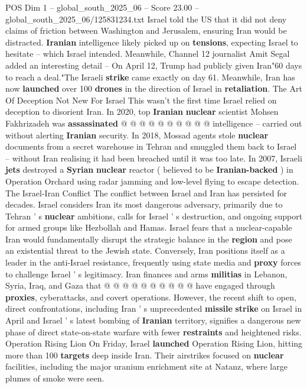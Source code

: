 \begin{textsample}{POS Dim 1 – global\_south\_2025\_06 – Score 23.00 – global\_south\_2025\_06/125831234.txt}
Israel told the US that it did not deny claims of friction between Washington and Jerusalem, ensuring Iran would be distracted. \textbf{Iranian} intelligence likely picked up on \textbf{tensions}, expecting Israel to hesitate -- which Israel intended.
Meanwhile, Channel 12 journalist Amit Segal added an interesting detail -- On April 12, Trump had publicly given Iran"60 days to reach a deal."The Israeli \textbf{strike} came exactly on day 61.
Meanwhile, Iran has now \textbf{launched} over 100 \textbf{drones} in the direction of Israel in \textbf{retaliation}.
The Art Of Deception Not New For Israel This wasn't the first time Israel relied on deception to disorient Iran.
In 2020, top \textbf{Iranian} \textbf{nuclear} scientist Mohsen Fakhrizadeh was \textbf{assassinated} @ @ @ @ @ @ @ @ @ @ intelligence -- carried out without alerting \textbf{Iranian} security.
In 2018, Mossad agents stole \textbf{nuclear} documents from a secret warehouse in Tehran and smuggled them back to Israel -- without Iran realising it had been breached until it was too late.
In 2007, Israeli \textbf{jets} destroyed a \textbf{Syrian} \textbf{nuclear} reactor ( believed to be \textbf{Iranian-backed} ) in Operation Orchard using radar jamming and low-level flying to escape detection.
The Israel-Iran Conflict The conflict between Israel and Iran has persisted for decades.
Israel considers Iran its most dangerous adversary, primarily due to Tehran ' s \textbf{nuclear} ambitions, calls for Israel ' s destruction, and ongoing support for armed groups like Hezbollah and Hamas.
Israel fears that a nuclear-capable Iran would fundamentally disrupt the strategic balance in the \textbf{region} and pose an existential threat to the Jewish state.
Conversely, Iran positions itself as a leader in the anti-Israel resistance, frequently using state media and \textbf{proxy} forces to challenge Israel ' s legitimacy.
Iran finances and arms \textbf{militias} in Lebanon, Syria, Iraq, and Gaza that @ @ @ @ @ @ @ @ @ @ have engaged through \textbf{proxies}, cyberattacks, and covert operations.
However, the recent shift to open, direct confrontations, including Iran ' s unprecedented \textbf{missile} \textbf{strike} on Israel in April and Israel ' s latest bombing of \textbf{Iranian} territory, signifies a dangerous new phase of direct state-on-state warfare with fewer \textbf{restraints} and heightened risks.
Operation Rising Lion On Friday, Israel \textbf{launched} Operation Rising Lion, hitting more than 100 \textbf{targets} deep inside Iran.
Their airstrikes focused on \textbf{nuclear} facilities, including the major uranium enrichment site at Natanz, where large plumes of smoke were seen.

\end{textsample}
